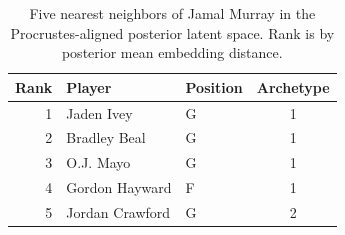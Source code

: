 \begin{table}[htbp]
  \centering\small
  \begin{tabular}{rllc}
    \toprule
    Rank & Player & Position & Archetype \\
    \midrule
    1 & Jaden Ivey & G & 1 \\
    2 & Bradley Beal & G & 1 \\
    3 & O.J. Mayo & G & 1 \\
    4 & Gordon Hayward & F & 1 \\
    5 & Jordan Crawford & G & 2 \\
    \bottomrule
  \end{tabular}
  \caption{Five nearest neighbors of Jamal Murray in the Procrustes-aligned posterior latent space. Rank is by posterior mean embedding distance.}
  \label{tab:Jamal_Murray_neighbors}
\end{table}

